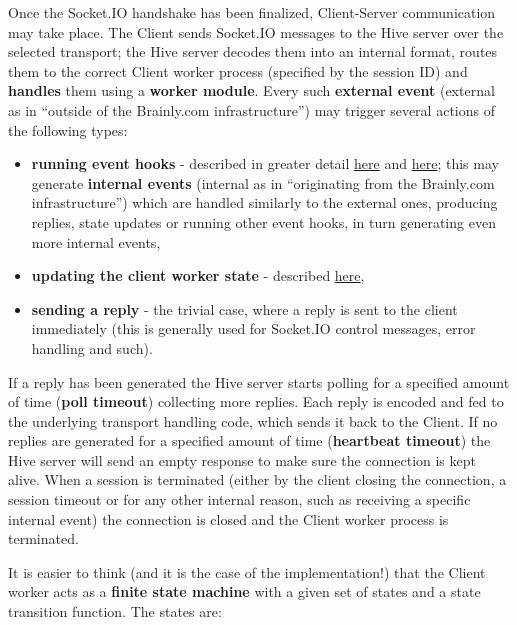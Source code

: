 \documentclass[a4paper]{article}
\begin{document}
Once the Socket.IO handshake has been finalized, Client-Server communication may take place. The Client sends Socket.IO messages to the Hive server over the selected transport; the Hive server decodes them into an internal format, routes them to the correct Client worker process (specified by the session ID) and \textbf{handles} them using a \textbf{worker module}. Every such \textbf{external event} (external as in ``outside of the Brainly.com infrastructure'') may trigger several actions of the following types:


\begin{itemize}
\item \textbf{running event hooks} - described in greater detail \hyperref[sec-7-1-4]{here} and \hyperref[sec-9-2]{here}; this may generate \textbf{internal events} (internal as in ``originating from the Brainly.com infrastructure'') which are handled similarly to the external ones, producing replies, state updates or running other event hooks, in turn generating even more internal events,
\item \textbf{updating the client worker state} - described \hyperref[sec-7-1-5]{here},
\item \textbf{sending a reply} - the trivial case, where a reply is sent to the client immediately (this is generally used for Socket.IO control messages, error handling and such).
\end{itemize}

\noindent
If a reply has been generated the Hive server starts polling for a specified amount of time (\textbf{poll timeout}) collecting more replies. Each reply is encoded and fed to the underlying transport handling code, which sends it back to the Client.
If no replies are generated for a specified amount of time (\textbf{heartbeat timeout}) the Hive server will send an empty response to make sure the connection is kept alive.
When a session is terminated (either by the client closing the connection, a session timeout or for any other internal reason, such as receiving a specific internal event) the connection is closed and the Client worker process is terminated.

It is easier to think (and it is the case of the implementation!) that the Client worker acts as a \textbf{finite state machine} with a given set of states and a state transition function. The states are:
\end{document}
